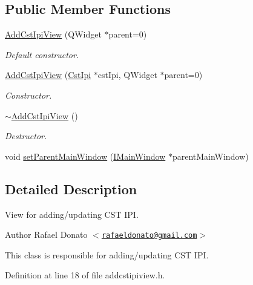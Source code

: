 \subsection*{\-Public \-Member \-Functions}
\begin{DoxyCompactItemize}
\item 
\hyperlink{class_add_cst_ipi_view_ac230615b78790e43186274fea76f3b40}{\-Add\-Cst\-Ipi\-View} (\-Q\-Widget $\ast$parent=0)
\begin{DoxyCompactList}\small\item\em \-Default constructor. \end{DoxyCompactList}\item 
\hyperlink{class_add_cst_ipi_view_a110249e3fc5de3ac4ba739bdc3213c33}{\-Add\-Cst\-Ipi\-View} (\hyperlink{class_cst_ipi}{\-Cst\-Ipi} $\ast$cst\-Ipi, \-Q\-Widget $\ast$parent=0)
\begin{DoxyCompactList}\small\item\em \-Constructor. \end{DoxyCompactList}\item 
\hyperlink{class_add_cst_ipi_view_ae916c021694583228fe7c5f73260c7ea}{$\sim$\-Add\-Cst\-Ipi\-View} ()
\begin{DoxyCompactList}\small\item\em \-Destructor. \end{DoxyCompactList}\item 
void \hyperlink{class_add_cst_ipi_view_a7c27c5868ba52127309024f81cd3ae18}{set\-Parent\-Main\-Window} (\hyperlink{class_i_main_window}{\-I\-Main\-Window} $\ast$parent\-Main\-Window)
\end{DoxyCompactItemize}


\subsection{\-Detailed \-Description}
\-View for adding/updating \-C\-S\-T \-I\-P\-I. 

\begin{DoxyAuthor}{\-Author}
\-Rafael \-Donato $<$\href{mailto:rafaeldonato@gmail.com}{\tt rafaeldonato@gmail.\-com}$>$
\end{DoxyAuthor}
\-This class is responsible for adding/updating \-C\-S\-T \-I\-P\-I. 

\-Definition at line 18 of file addcstipiview.\-h.



